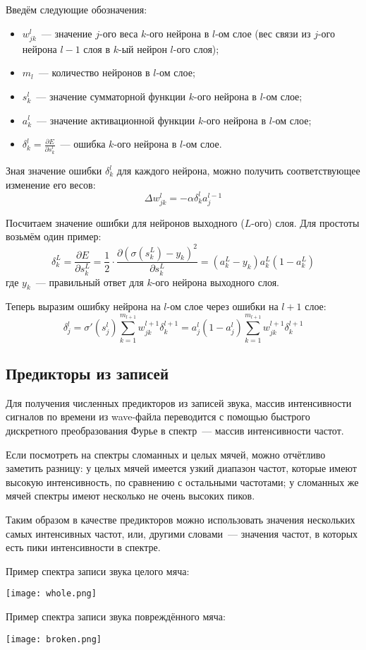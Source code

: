 	Введём следующие обозначения:
	\begin{itemize}
		\item $w_{jk}^l$~--- значение $j$-ого веса $k$-ого нейрона в $l$-ом слое (вес связи из $j$-ого нейрона $l - 1$ слоя в $k$-ый нейрон $l$-ого слоя);
		\item $m_l$~--- количество нейронов в $l$-ом слое;
		\item $s_k^l$~--- значение сумматорной функции $k$-ого нейрона в $l$-ом слое;
		\item $a_k^l$~--- значение активационной функции $k$-ого нейрона в $l$-ом слое;
		\item $\delta_k^l = \frac{\partial E}{\partial s_k^l}$~--- ошибка $k$-ого нейрона в $l$-ом слое.
	\end{itemize}

	Зная значение ошибки $\delta_k^l$ для каждого нейрона, можно получить соответствующее изменение его весов:
	\[
		\Delta w_{jk}^l = -\alpha\delta_k^l a_j^{l-1}
	\]

	Посчитаем значение ошибки для нейронов выходного ($L$-ого) слоя. Для простоты возьмём один пример:
	\[
		\delta_k^L = \frac{\partial E}{\partial s_k^L} =
		\frac{1}{2}\cdot\frac{\partial\left(\sigma\left(s_k^L\right) - y_k\right)^2}{\partial s_k^L} = 
		\left(a_k^L - y_k\right)a_k^L\left(1 - a_k^L\right)
	\]
	где $y_k$~--- правильный ответ для $k$-ого нейрона выходного слоя.

	Теперь выразим ошибку нейрона на $l$-ом слое через ошибки на $l + 1$ слое:
	\[
		\delta_j^l = \sigma\prime\left(s_j^l\right)\sum_{k = 1}^{m_{l + 1}} w_{jk}^{l + 1} \delta_k^{l+1} = 
		a_j^l\left(1 - a_j^l\right)\sum_{k = 1}^{m_{l + 1}} w_{jk}^{l + 1} \delta_k^{l+1}
	\]

\subsection{Предикторы из записей}
	Для получения численных предикторов из записей звука, массив интенсивности сигналов по времени из wave-файла
	переводится с помощью быстрого дискретного преобразования Фурье в спектр~--- массив интенсивности частот.

	Если посмотреть на спектры сломанных и целых мячей, можно отчётливо заметить разницу: у целых мячей
	имеется узкий диапазон частот, которые имеют высокую интенсивность, по сравнению с остальными частотами;
	у сломанных же мячей спектры имеют несколько не очень высоких пиков.
	
	Таким образом в качестве предикторов можно использовать значения нескольких самых интенсивных частот,
	или, другими словами~--- значения частот, в которых есть пики интенсивности	в спектре.

	\newpage
	\parskip=0cm

	Пример спектра записи звука целого мяча:

	\texttt{[image: whole.png]}

	Пример спектра записи звука повреждённого мяча:

	\texttt{[image: broken.png]}

	\parskip=0.2cm